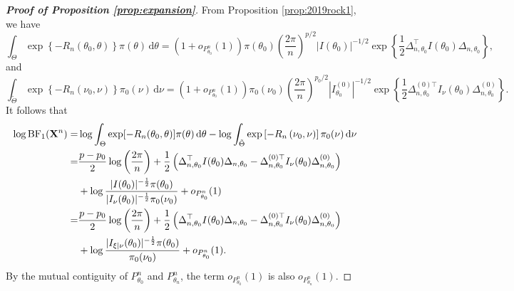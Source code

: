 \documentclass[11pt]{article}
\theoremstyle{plain}
\theoremstyle{definition}
\theoremstyle{remark}
\begin{document}
\begin{appendices}
    \begin{proof}[\textbf{Proof of Proposition \ref{prop:expansion}}]
From Proposition \ref{prop:2019rock1}, we have
$$
    \int_{\Theta}
    \exp\left\{-R_n(\theta_0, \theta) \right\} \pi(\theta)
\, \mathrm d \theta
    =
    (1+o_{P^n_{\theta_0}}(1))
    \pi(\theta_0)
    \left(\frac{2\pi}{ n}\right)^{{p}/{2}}
    |I(\theta_0)|^{-{1}/{2}} 
    \exp
    \left\{ 
        \frac{1}{2}\Delta_{n,\theta_0}^\top  I({\theta_0})\Delta_{n,\theta_0}
\right\}
,
$$
and
\begin{equation*}
    \int_{\tilde \Theta}
    \exp\left\{- R_n\left(\nu_0, \nu \right)\right\} \pi_0(\nu)
\, \mathrm d \nu
    =
    (1+o_{P^n_{\theta_0}}(1))
    \pi_0(\nu_0)
    \left(\frac{2\pi}{ n}\right)^{{p_0}/{2}}
     |I_{\theta_0}^{(0)}|^{-{1}/{2}} 
     \exp\left\{ 
         \frac{1}{2}\Delta_{n,\theta_0}^{{(0)}\top} I_{\nu}(\theta_0)\Delta^{(0)}_{n,\theta_0}
     \right\}
     .
\end{equation*}
It follows that
\begin{align*}
    \log \text{BF}_1 (\mathbf{X}^{n})
    =&
    \log
    \int_{\Theta}
\exp[- R_n(\theta_0, \theta)] \pi(\theta)
\, \mathrm d \theta
-
    \log \int_{\tilde \Theta}
    \exp\left[- R_n\left(\nu_0, \nu \right)\right] \pi_0(\nu)
\, \mathrm d \nu
    \\
    =&
   {\frac{p-p_0}{2}} \log \left( \frac{2\pi}{n} \right)
+
        \frac 1 2 \left( 
            \Delta_{n,\theta_0}^\top  I(\theta_0)  \Delta_{n,\theta_0}
            -
            \Delta_{n,\theta_0}^{{(0)}\top} I_{\nu}(\theta_0)\Delta^{(0)}_{n,\theta_0}
        \right)
        \\
   &+
   \log
       \frac{
           |I(\theta_0)|^{-\frac 1 2}\pi(\theta_0) 
   }{
       |I_\nu(\theta_0)|^{-\frac 1 2}\pi_0(\nu_0)
}
    +o_{P^n_{\theta_0}}(1)
    \\
    =&
   {\frac{p-p_0}{2}} \log \left( \frac{2\pi}{n} \right)
+
        \frac 1 2 \left( 
            \Delta_{n,\theta_0}^\top  I(\theta_0)  \Delta_{n,\theta_0}
            -
            \Delta_{n,\theta_0}^{{(0)}\top} I_{\nu}(\theta_0)\Delta^{(0)}_{n,\theta_0}
        \right)
        \\
   &+
   \log
       \frac{
           |I_{\xi | \nu}(\theta_0)|^{-\frac 1 2}\pi(\theta_0) 
   }{
    \pi_0(\nu_0)
}
    +o_{P^n_{\theta_0}}(1)
    .
\end{align*}
By the mutual contiguity of $P_{\theta_0}^n$ and $P^n_{\theta_n}$, the term $o_{P^n_{\theta_0}}(1)$ is also $o_{P^n_{\theta_n}}(1)$. 
          

\end{proof}
\end{appendices}
\end{document}
